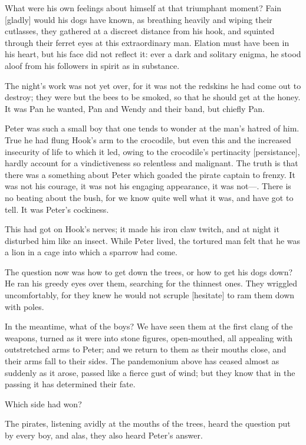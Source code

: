 What were his own feelings about himself at that triumphant moment? Fain
[gladly] would his dogs have known, as breathing heavily and wiping their
cutlasses, they gathered at a discreet distance from his hook, and
squinted through their ferret eyes at this extraordinary man. Elation must
have been in his heart, but his face did not reflect it: ever a dark and
solitary enigma, he stood aloof from his followers in spirit as in
substance.


The night's work was not yet over, for it was not the redskins he had come
out to destroy; they were but the bees to be smoked, so that he should get
at the honey. It was Pan he wanted, Pan and Wendy and their band, but
chiefly Pan.


Peter was such a small boy that one tends to wonder at the man's hatred of
him. True he had flung Hook's arm to the crocodile, but even this and the
increased insecurity of life to which it led, owing to the crocodile's
pertinacity [persistance], hardly account for a vindictiveness so
relentless and malignant. The truth is that there was a something about
Peter which goaded the pirate captain to frenzy. It was not his courage,
it was not his engaging appearance, it was not—. There is no beating
about the bush, for we know quite well what it was, and have got to tell.
It was Peter's cockiness.


This had got on Hook's nerves; it made his iron claw twitch, and at night
it disturbed him like an insect. While Peter lived, the tortured man felt
that he was a lion in a cage into which a sparrow had come.


The question now was how to get down the trees, or how to get his dogs
down? He ran his greedy eyes over them, searching for the thinnest ones.
They wriggled uncomfortably, for they knew he would not scruple [hesitate]
to ram them down with poles.


In the meantime, what of the boys? We have seen them at the first clang of
the weapons, turned as it were into stone figures, open-mouthed, all
appealing with outstretched arms to Peter; and we return to them as their
mouths close, and their arms fall to their sides. The pandemonium above
has ceased almost as suddenly as it arose, passed like a fierce gust of
wind; but they know that in the passing it has determined their fate.


Which side had won?


The pirates, listening avidly at the mouths of the trees, heard the
question put by every boy, and alas, they also heard Peter's answer.



